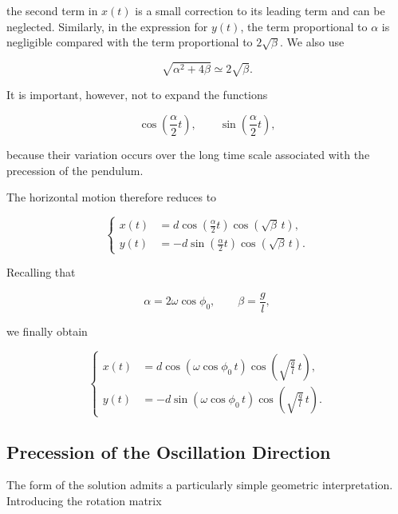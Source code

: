\documentclass[12pt]{article}
\begin{document}
the second term in \(x(t)\) is a small correction to its leading term and can
be neglected. Similarly, in the expression for \(y(t)\), the term proportional
to \(\alpha\) is negligible compared with the term proportional to
\(2\sqrt{\beta}\). We also use

\[
  \sqrt{\alpha^2+4\beta}
  \simeq
  2\sqrt{\beta}.
\]

It is important, however, not to expand the functions

\[
  \cos\left(\frac{\alpha}{2}t\right),
  \qquad
  \sin\left(\frac{\alpha}{2}t\right),
\]

because their variation occurs over the long time scale associated with the
precession of the pendulum.

The horizontal motion therefore reduces to

\begin{equation}
  \left\{
  \begin{aligned}
    x(t)
    &=
    d
    \cos\left(\frac{\alpha}{2}t\right)
    \cos\left(\sqrt{\beta}\,t\right),
    \\[0.5em]
    y(t)
    &=
    -d
    \sin\left(\frac{\alpha}{2}t\right)
    \cos\left(\sqrt{\beta}\,t\right).
  \end{aligned}
  \right.
  \label{eq:foucault-final-solution-alpha-beta}
\end{equation}

Recalling that

\[
  \alpha=2\omega\cos\phi_0,
  \qquad
  \beta=\frac{g}{l},
\]

we finally obtain

\begin{equation}
  \left\{
  \begin{aligned}
    x(t)
    &=
    d
    \cos\left(\omega\cos\phi_0\,t\right)
    \cos\left(\sqrt{\frac{g}{l}}\,t\right),
    \\[0.5em]
    y(t)
    &=
    -d
    \sin\left(\omega\cos\phi_0\,t\right)
    \cos\left(\sqrt{\frac{g}{l}}\,t\right).
  \end{aligned}
  \right.
  \label{eq:foucault-final-solution}
\end{equation}

\subsection{Precession of the Oscillation Direction}

The form of the solution admits a particularly simple geometric
interpretation. Introducing the rotation matrix
\end{document}
